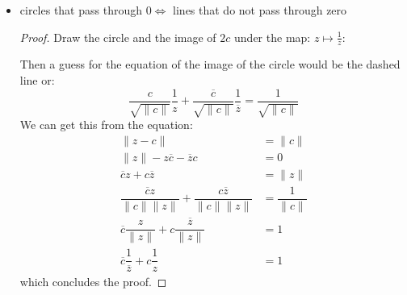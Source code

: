 \documentclass{article}
\begin{document}
\begin{itemize}
        \item circles that pass through $0 \iff$ lines that do not pass through zero
            \begin{proof}
                Draw the circle and the image of $2c$ under the map: $z \mapsto \frac{1}{z}$:
                    \begin{fixedfigure}
                    \end{fixedfigure}
                Then a guess for the equation of the image of the circle would be the dashed line or:
                    \begin{equation*}
                        \dfrac{c}{\sqrt{\lVert c \rVert}}\dfrac{1}{z} + \dfrac{\overline{c}}{\sqrt{\lVert c \rVert}}\dfrac{1}{\overline{z}} = \dfrac{1}{\sqrt{\lVert c \rVert}}
                    \end{equation*}
                We can get this from the equation:
                    \begin{align*}
                        \lVert z - c \rVert                                                                                           &= \lVert c \rVert            \\
                        \lVert z \rVert - z\overline{c} - \overline{z}c                                                               &= 0                          \\
                        \overline{c}z + c\overline{z}                                                                                 &= \lVert z \rVert            \\
                        \dfrac{\overline{c}z}{\lVert c \rVert\lVert z \rVert} + \dfrac{c\overline{z}}{\lVert c \rVert\lVert z \rVert} &= \dfrac{1}{\lVert c \rVert} \\
                        \overline{c}\dfrac{z}{\lVert z \rVert} + c \dfrac{\overline{z}}{\lVert z \rVert}                              &= 1                          \\
                        \overline{c}\dfrac{1}{\overline{z}} + c \dfrac{1}{z}                                                          &= 1                            
                    \end{align*}
                which concludes the proof.
            \end{proof}


\end{itemize}
\end{document}
